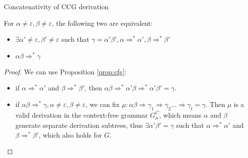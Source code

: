\documentclass[main.tex]{subfiles}
\begin{document}
\begin{prop}\label{prop:concat}
    Concatenativity of CCG derivation

    For $\alpha \neq \varepsilon, \beta \neq \varepsilon$, the following two are equivalent:
    \begin{itemize}

        \item $\exists \alpha' \neq \varepsilon, \beta' \neq \varepsilon$
            such that $\gamma = \alpha' \beta', \alpha \Rightarrow^* \alpha', \beta \Rightarrow^* \beta'$
        \item $\alpha \beta \Rightarrow^* \gamma$
    \end{itemize}
\end{prop}
\begin{proof}
    We can use Proposition \ref{prop:cfg}:

    \begin{itemize}
        \item if $\alpha \Rightarrow^* \alpha'$ and $\beta \Rightarrow^* \beta'$,
            then $\alpha \beta \Rightarrow^* \alpha' \beta \Rightarrow^* \alpha' \beta' = \gamma$.
        \item if $\alpha \beta \Rightarrow^* \gamma, \alpha \neq \varepsilon, \beta \neq \varepsilon$,
            we can fix $\mu: \alpha \beta \Rightarrow \gamma_1 \Rightarrow \gamma_2 ... \Rightarrow \gamma_t = \gamma$.
            Then $\mu$ is a valid derivation in the context-free grammar $G^C_{\mu}$,
            which means $\alpha$ and $\beta$ generate separate derivation
            subtrees, thus $\exists \alpha' \beta' = \gamma$ such that
            $\alpha \Rightarrow^* \alpha'$ and $\beta \Rightarrow^* \beta'$,
            which also holds for $G$.
    \end{itemize}
\end{proof}
\end{document}
